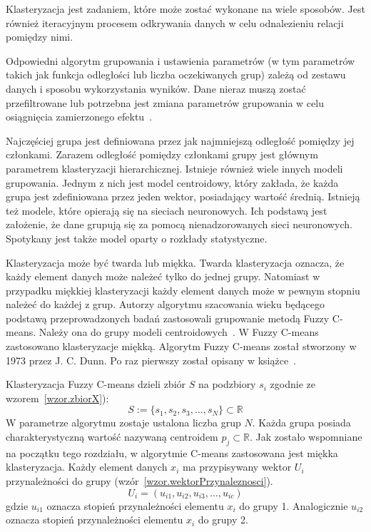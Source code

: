 \documentclass[a4paper,twoside,12pt]{book}
\begin{document}
    Klasteryzacja jest zadaniem, które może zostać wykonane na wiele sposobów.
    Jest również iteracyjnym procesem odkrywania danych w celu odnalezieniu relacji pomiędzy nimi.

    Odpowiedni algorytm grupowania i ustawienia parametrów (w tym parametrów
    takich jak funkcja odległości lub liczba oczekiwanych grup)
    zależą od zestawu danych i sposobu wykorzystania wyników.
    Dane nieraz muszą zostać przefiltrowane lub potrzebna jest zmiana parametrów grupowania w celu osiągnięcia
    zamierzonego efektu~\cite{clusterWstep}.

    Najczęściej grupa jest definiowana przez jak najmniejszą odległość pomiędzy jej członkami.
    Zarazem odległość pomiędzy członkami grupy jest głównym parametrem klasteryzacji hierarchicznej.
    Istnieje również wiele innych modeli grupowania.
    Jednym z nich jest model centroidowy,
    który zakłada, że każda grupa jest zdefiniowana przez jeden wektor, posiadający wartość średnią.
    Istnieją też modele, które opierają się na sieciach neuronowych.
    Ich podstawą jest założenie, że dane grupują się za pomocą nienadzorowanych sieci neuronowych.
    Spotykany jest także model oparty o rozkłady statystyczne.

    Klasteryzacja może być twarda lub miękka.
    Twarda klasteryzacja oznacza, że każdy element danych może należeć tylko do jednej grupy.
    Natomiast w przypadku miękkiej klasteryzacji każdy element danych może w pewnym stopniu należeć do każdej z grup.
    Autorzy algorytmu szacowania wieku będącego podstawą przeprowadzonych badań zastosowali grupowanie metodą Fuzzy
    C-means.
    Należy ona do grupy modeli centroidowych~\cite{clusterWstep}. W Fuzzy C-means zastosowano klasteryzacje miękką.
    Algorytm Fuzzy C-means został stworzony w 1973 przez J. C. Dunn. Po raz pierwszy został opisany w
    książce~\cite{ISODATA}.


    Klasteryzacja Fuzzy C-means dzieli zbiór $S$ na podzbiory $s_{i}$ zgodnie ze wzorem~\ref{wzor.zbiorX}):
    \large
    \begin{equation}
        S:=\{s_{1},s_{2},s_{3},\ldots,s_{N}\}\subset \mathbb{R}
        \label{wzor.zbiorX}
    \end{equation}
    \normalsize
    W parametrze algorytmu zostaje ustalona liczba grup $N$.
    Każda grupa posiada charakterystyczną wartość nazywaną centroidem $p_{j}\subset \mathbb{R}$.
    Jak zostało wspomniane na początku tego rozdziału, w algorytmie C-means zastosowana jest miękka klasteryzacja.
    Każdy element danych $x_{i}$ ma przypisywany wektor $U_{i}$ przynależności do grupy
    (wzór~\ref{wzor.wektorPrzynaleznosci}).
    \large
    \begin{equation}
        U_{i}=(u_{i1}, u_{i2}, u_{i3}, \ldots, u_{ic})
        \label{wzor.wektorPrzynaleznosci}
    \end{equation}
    \normalsize
    gdzie $u_{i1}$ oznacza stopień przynależności elementu $x_{i}$ do grupy 1.
    Analogicznie $u_{i2}$ oznacza stopień przynależności elementu $x_{i}$ do grupy 2.
\end{document}
